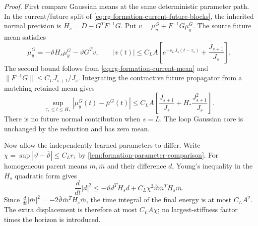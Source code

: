 \emph{Proof.}
First compare Gaussian means at the same deterministic parameter
path. In the current/future split of
\cref{eq:rg-formation-current-future-blocks}, the inherited normal
precision is $H_s=D-G^TF^{-1}G$. Put
$v=\mu_u^G+F^{-1}G\mu_y^G$. The source future mean satisfies
\begin{equation}
 \dot\mu_y^G=-\vartheta H_s\mu_y^G-\vartheta G^Tv,
 \qquad
 |v(t)|\le C_LA\left[
 e^{-c_LJ_s(t-\tau_s)}+\frac{J_{s+1}}{J_s}\right].
 \label{eq:rg-formation-gaussian-mean-defect}
\end{equation}
The second bound follows from
\cref{eq:rg-formation-current-mean} and
$\|F^{-1}G\|\le C_LJ_{s+1}/J_s$. Integrating the contractive
future propagator from a matching retained mean gives
\begin{equation}
 \sup_{\tau_s\le t\le H_*}
 |\mu_y^G(t)-\overline\mu^G(t)|
 \le C_LA\left[
 \frac{J_{s+1}}{J_s}
 +H_*\frac{J_{s+1}^2}{J_s}\right].
 \label{eq:rg-formation-gaussian-mean-reduction}
\end{equation}
There is no future normal contribution when $s=L$. The loop
Gaussian core is unchanged by the reduction and has zero mean.

Now allow the independently learned parameters to differ. Write
$\chi=\sup|\vartheta-\overline\vartheta|\le C_Lr_\epsilon$ by
\cref{lem:formation-parameter-comparison}. For homogeneous parent
means $m,\overline m$ and their difference $d$, Young's inequality
in the $H_s$ quadratic form gives
\begin{equation}
 \frac d{dt}|d|^2
 \le-\vartheta d^TH_sd
       +C_L\chi^2\overline\vartheta
                         \overline m^TH_s\overline m.
 \label{eq:rg-formation-mean-parameter-energy}
\end{equation}
Since
$\frac d{dt}|\overline m|^2
=-2\overline\vartheta\overline m^TH_s\overline m$,
the time integral of the final energy is at most $C_LA^2$.
The extra displacement is therefore at most $C_LA\chi$; no
largest-stiffness factor times the horizon is introduced.


